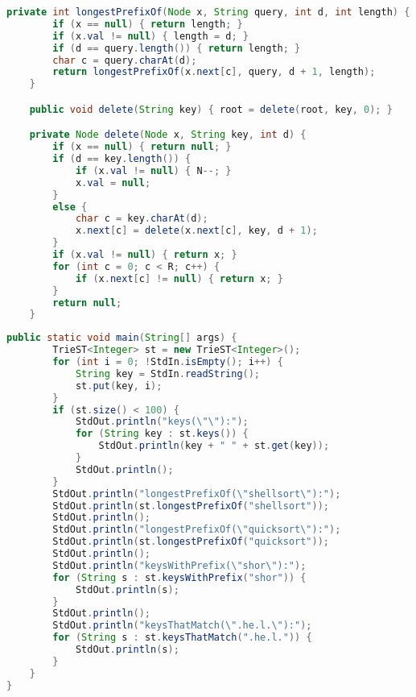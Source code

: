 \documentclass[8pt,a4paper,compress,handout]{beamer}
\begin{document}
\begin{frame}[fragile]
\pause

\begin{lstlisting}[language=Java]
    private int longestPrefixOf(Node x, String query, int d, int length) {
        if (x == null) { return length; }
        if (x.val != null) { length = d; }
        if (d == query.length()) { return length; }
        char c = query.charAt(d);
        return longestPrefixOf(x.next[c], query, d + 1, length);
    }

    public void delete(String key) { root = delete(root, key, 0); }

    private Node delete(Node x, String key, int d) {
        if (x == null) { return null; }
        if (d == key.length()) {
            if (x.val != null) { N--; }
            x.val = null;
        }
        else {
            char c = key.charAt(d);
            x.next[c] = delete(x.next[c], key, d + 1);
        }
        if (x.val != null) { return x; }
        for (int c = 0; c < R; c++) {
            if (x.next[c] != null) { return x; }
        }
        return null;
    }
\end{lstlisting}
\end{frame}

\begin{frame}[fragile]
\pause

\begin{lstlisting}[language=Java]
    public static void main(String[] args) {
        TrieST<Integer> st = new TrieST<Integer>();
        for (int i = 0; !StdIn.isEmpty(); i++) {
            String key = StdIn.readString();
            st.put(key, i);
        }
        if (st.size() < 100) {
            StdOut.println("keys(\"\"):");
            for (String key : st.keys()) {
                StdOut.println(key + " " + st.get(key));
            }
            StdOut.println();
        }
        StdOut.println("longestPrefixOf(\"shellsort\"):");
        StdOut.println(st.longestPrefixOf("shellsort"));
        StdOut.println();
        StdOut.println("longestPrefixOf(\"quicksort\"):");
        StdOut.println(st.longestPrefixOf("quicksort"));
        StdOut.println();
        StdOut.println("keysWithPrefix(\"shor\"):");
        for (String s : st.keysWithPrefix("shor")) { 
            StdOut.println(s); 
        }
        StdOut.println();
        StdOut.println("keysThatMatch(\".he.l.\"):");
        for (String s : st.keysThatMatch(".he.l.")) { 
            StdOut.println(s); 
        }
    }
}
\end{lstlisting}
\end{frame}
\end{document}
